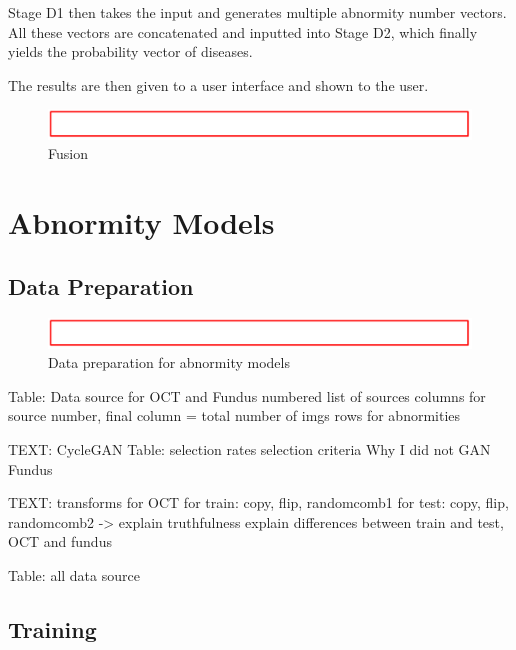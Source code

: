 \documentclass{article}
\begin{document}
		Stage D1 then takes the input and generates multiple abnormity number vectors. All these vectors are concatenated and inputted into Stage D2, which finally yields the probability vector of diseases.
		
		The results are then given to a user interface and shown to the user.
		
		\begin{figure}[htbp]
			\centering
			\includegraphics[width=\linewidth]{Figs/Temp.png}
			\caption{Fusion}
			\vspace{0.3cm}
			\label{fig:fusion}
		\end{figure}
		
	\section{Abnormity Models}
	
		\subsection{Data Preparation}
			
			\begin{figure}[htbp]
				\centering
				\includegraphics[width=\linewidth]{Figs/Temp.png}
				\caption{Data preparation for abnormity models}
				\vspace{0.3cm}
				\label{fig:A_data_prep}
			\end{figure}
			
			Table: Data source for OCT and Fundus
				numbered list of sources
				columns for source number, final column = total number of imgs
				rows for abnormities
			
			TEXT: CycleGAN
				Table: selection rates
				selection criteria
				Why I did not GAN Fundus
				
			TEXT: transforms for OCT
				for train: copy, flip, randomcomb1
				for test: copy, flip, randomcomb2 -> explain truthfulness
				explain differences between train and test, OCT and fundus

			Table: all data source
			
		\subsection{Training}
			
\end{document}
